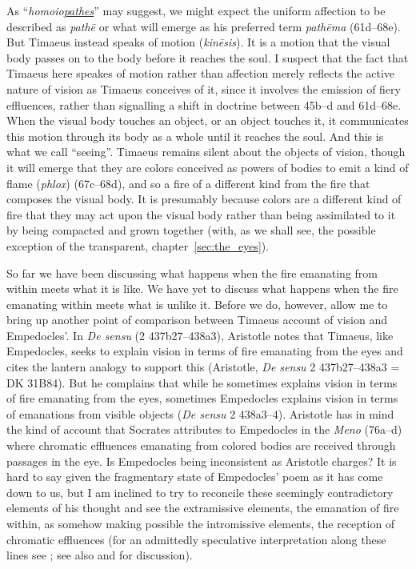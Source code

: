 As ``\emph{homoio\underline{pathes}}'' may suggest, we might expect the uniform affection to be described as \emph{pathē} or what will emerge as his preferred term \emph{pathēma} (61d--68e). But Timae\-us instead speaks of motion (\emph{kinēsis}). It is a motion that the visual body passes on to the body before it reaches the soul. I suspect that the fact that Timaeus here speakes of motion rather than affection merely reflects the active nature of vision as Timaeus conceives of it, since it involves the emission of fiery effluences, rather than signalling a shift in doctrine between 45b--d and 61d--68e. When the visual body touches an object, or an object touches it, it communicates this motion through its body as a whole until it reaches the soul. And this is what we call ``seeing''. Timaeus remains silent about the objects of vision, though it will emerge that they are colors conceived as powers of bodies to emit a kind of flame (\emph{phlox}) (67c–68d), and so a fire of a different kind from the fire that composes the visual body. It is presumably because colors are a different kind of fire that they may act upon the visual body rather than being assimilated to it by being compacted and grown together (with, as we shall see, the possible exception of the transparent, chapter~\ref{sec:the_eyes}).

So far we have been discussing what happens when the fire emanating from within meets what it is like. We have yet to discuss what happens when the fire emanating within meets what is unlike it. Before we do, however, allow me to bring up another point of comparison between Timaeus account of vision and Empedocles'. In \emph{De sensu} (2 437b27--438a3), Aristotle notes that Timaeus, like Empedocles, seeks to explain vision in terms of fire emanating from the eyes and cites the lantern analogy to support this (Aristotle, \emph{De sensu} 2 437b27–438a3 = DK 31B84). But he complains that while he sometimes explains vision in terms of fire emanating from the eyes, sometimes Empedocles explains vision in terms of emanations from visible objects (\emph{De sensu} 2 438a3--4). Aristotle has in mind the kind of account that Socrates attributes to Empedocles in the \emph{Meno} (76a--d) where chromatic effluences emanating from colored bodies are received through passages in the eye. Is Empedocles being inconsistent as Aristotle charges? It is hard to say given the fragmentary state of Empedocles' poem as it has come down to us, but I am inclined to try to reconcile these seemingly contradictory elements of his thought and see the extramissive elements, the emanation of fire within, as somehow making possible the intromissive elements, the reception of chromatic effluences (for an admittedly speculative interpretation along these lines see \citealt[chapter 1.3]{Kalderon:2015fr}; see also \citealt[152 n5]{Hammond:1903aa} and \citealt[137]{Ross:1906fk} for discussion). 

